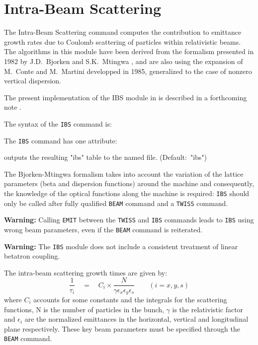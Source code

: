 


\chapter{Intra-Beam Scattering}
\label{chap:ibs}

The Intra-Beam Scattering command computes the contribution to emittance
growth rates due to Coulomb scattering of particles within relativistic
beams. The algorithms in this module have been derived from the formalism
presented in 1982 by J.D.~Bjorken and S.K.~Mtingwa
\cite{bjorken-mtingwa1982}, and are also using the expansion of M.~Conte
and M.~Martini \cite{conte-martini1985} developped in 1985, generalized
to the case of nonzero vertical dispersion.  

The present implementation of the IBS module in \madx is described in a
forthcoming note \cite{antoniou-zimmermann2012}.


The syntax of the \texttt{IBS} command is:

The \texttt{IBS} command has one attribute:
\begin{madlist}
   outputs the resulting "ibs" table to the named file. (Default:~"ibs")
\end{madlist}

The Bjorken-Mtingwa formalism takes into account the variation of the
lattice parameters (beta and dispersion functions) around the
machine and consequently, the knowledge of the optical functions along
the machine is required: \texttt{IBS} should only be called after fully
qualified \texttt{BEAM} command and a \texttt{TWISS} command. 

\textbf{Warning:} Calling \texttt{EMIT} between the \texttt{TWISS} and
\texttt{IBS} commands leads to \texttt{IBS} using wrong beam parameters,
even if the \texttt{BEAM} command is reiterated.

\textbf{Warning:} The \texttt{IBS} module does not include a consistent treatment of
linear betatron coupling.   

The intra-beam scattering growth times are given by:
\[
 \frac{1}{\tau_i} \quad = \quad C_i \times \frac{N}{\gamma \epsilon_x
   \epsilon_y \epsilon_s} \qquad (i = x, y, s) 
\]
where $C_i$ accounts for some constants and the integrals for the
scattering functions, N is the number of particles in the bunch,
$\gamma$ is the relativistic factor and $\epsilon_i$ are the normalized
emittances in the horizontal, vertical and longitudinal plane
respectively. These key beam parameters must be specified through the
\texttt{BEAM} command. 

